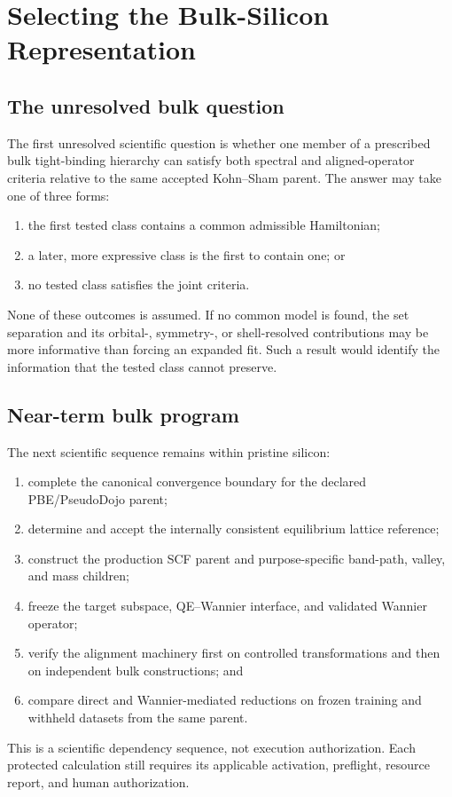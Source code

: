 \chapter{Selecting the Bulk-Silicon Representation}

\label{ch:selecting-bulk-representation}


\section{The unresolved bulk question}


The first unresolved scientific question is whether one member of a prescribed
bulk tight-binding hierarchy can satisfy both spectral and aligned-operator
criteria relative to the same accepted Kohn--Sham parent. The answer may take
one of three forms:

\begin{enumerate}
  \item the first tested class contains a common admissible Hamiltonian;
  \item a later, more expressive class is the first to contain one; or
  \item no tested class satisfies the joint criteria.
\end{enumerate}

None of these outcomes is assumed. If no common model is found, the set
separation and its orbital-, symmetry-, or shell-resolved contributions may be
more informative than forcing an expanded fit. Such a result would identify the
information that the tested class cannot preserve.

\section{Near-term bulk program}


The next scientific sequence remains within pristine silicon:

\begin{enumerate}
  \item complete the canonical convergence boundary for the declared
    PBE/PseudoDojo parent;
  \item determine and accept the internally consistent equilibrium lattice
    reference;
  \item construct the production SCF parent and purpose-specific band-path,
    valley, and mass children;
  \item freeze the target subspace, QE--Wannier interface, and validated Wannier
    operator;
  \item verify the alignment machinery first on controlled transformations and
    then on independent bulk constructions; and
  \item compare direct and Wannier-mediated reductions on frozen training and
    withheld datasets from the same parent.
\end{enumerate}

This is a scientific dependency sequence, not execution authorization. Each
protected calculation still requires its applicable activation, preflight,
resource report, and human authorization.
